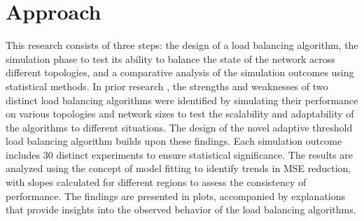 \section{Approach}\label{sec:approach}
This research consists of three steps: the design of a load balancing algorithm, the simulation phase to test its ability to balance the state of the network across different topologies, and a comparative analysis of the simulation outcomes using statistical methods. In prior research \cite{Bayazitoglu}, the strengths and weaknesses of two distinct load balancing algorithms were identified by simulating their performance on various topologies and network sizes to test the scalability and adaptability of the algorithms to different situations. The design of the novel adaptive threshold load balancing algorithm builds upon these findings. Each simulation outcome includes 30 distinct experiments to ensure statistical significance. The results are analyzed using the concept of model fitting to identify trends in MSE reduction, with slopes calculated for different regions to assess the consistency of performance. The findings are presented in plots, accompanied by explanations that provide insights into the observed behavior of the load balancing algorithms.
